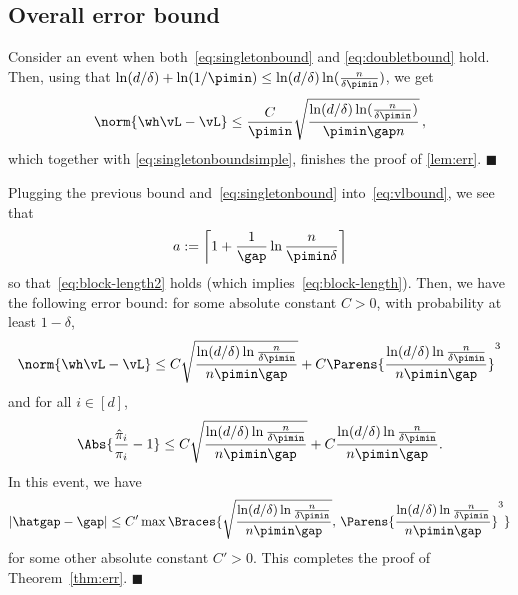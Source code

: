 \subsection{Overall error bound}
Consider an event when both~\eqref{eq:singletonbound} and \eqref{eq:doubletbound} hold.
Then, using that $\ln(d/\delta) + \ln(1/\pimin) \le \ln(d/\delta)\ln(\frac{n}{\delta\pimin})$, we get
\begin{align*}
\norm{\wh\vL - \vL} \le 
\frac{C}{\pimin}
\sqrt{
    \frac{\ln(d/\delta)\ln(\frac{n}{\delta\pimin})}{\pimin\gap n}
  }\,,
\end{align*}
which together with \eqref{eq:singletonboundsimple},
finishes the proof of \cref{lem:err}.
\hfill $\blacksquare$


Plugging the previous bound and~\eqref{eq:singletonbound} into~\eqref{eq:vlbound}, we see that
\[
  a := \left\lceil 1 + \frac{1}{\gap}\ln\frac{n}{\pimin\delta} \right\rceil
\]
so that~\eqref{eq:block-length2} holds (which implies~\eqref{eq:block-length}).
Then, we have the following error bound: for some absolute constant
$C>0$, with probability at least $1-\delta$, 
\begin{equation}
  \norm{\wh\vL - \vL}
  \leq
  C
  \sqrt{\frac{\ln(d/\delta)\ln\frac{n}{\delta\pimin}}{n\pimin\gap}}
  +
  C
  \Parens{
    \frac{\ln(d/\delta)\ln\frac{n}{\delta\pimin}}{n\pimin\gap}
  }^3
\end{equation}
and for all $i \in [d]$,
\begin{equation}
  \Abs{ \frac{\hat\pi_i}{\pi_i} - 1 }
  \leq 
  C
  \sqrt{\frac{\ln(d/\delta)\ln\frac{n}{\delta\pimin}}{n\pimin\gap}}
  +
  C
  \frac{\ln(d/\delta)\ln\frac{n}{\delta\pimin}}{n\pimin\gap}
  .
\end{equation}
In this event, we have
\begin{equation}
  |\hatgap - \gap|
  \leq
  C'
  \max\Braces{
    \sqrt{\frac{\ln(d/\delta)\ln\frac{n}{\delta\pimin}}{n\pimin\gap}}
    ,\,
    \Parens{
      \frac{\ln(d/\delta)\ln\frac{n}{\delta\pimin}}{n\pimin\gap}
    }^3
  }
\end{equation}
for some other absolute constant $C'>0$.
This completes the proof of Theorem~\ref{thm:err}.
\hfill $\blacksquare$
\fi


